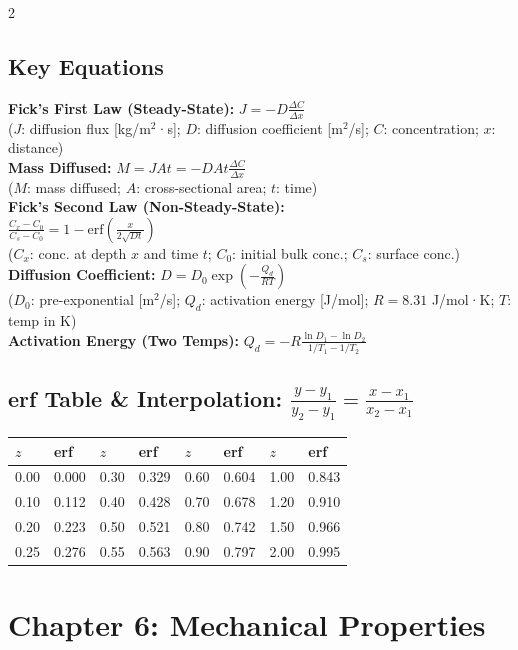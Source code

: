 \documentclass[8pt]{extarticle}
\begin{document}
\begin{multicols*}{2}
\subsection*{Key Equations}
\textbf{Fick's First Law (Steady-State):} $J = -D\frac{\Delta C}{\Delta x}$ \\
($J$: diffusion flux [kg/m$^2$·s]; $D$: diffusion coefficient [m$^2$/s]; $C$: concentration; $x$: distance) \\
\textbf{Mass Diffused:} $M = JAt = -DAt\frac{\Delta C}{\Delta x}$ \\
($M$: mass diffused; $A$: cross-sectional area; $t$: time) \\
\textbf{Fick's Second Law (Non-Steady-State):} \\
$\frac{C_x - C_0}{C_s - C_0} = 1 - \mathrm{erf}\!\left(\frac{x}{2\sqrt{Dt}}\right)$ \\
($C_x$: conc. at depth $x$ and time $t$; $C_0$: initial bulk conc.; $C_s$: surface conc.) \\
\textbf{Diffusion Coefficient:} $D = D_0\exp\!\left(-\frac{Q_d}{RT}\right)$ \\
($D_0$: pre-exponential [m$^2$/s]; $Q_d$: activation energy [J/mol]; $R=8.31$ J/mol·K; $T$: temp in K) \\
\textbf{Activation Energy (Two Temps):} $Q_d = -R\frac{\ln D_1 - \ln D_2}{1/T_1 - 1/T_2}$

\subsection*{erf Table \& Interpolation: $\frac{y-y_1}{y_2-y_1}=\frac{x-x_1}{x_2-x_1}$}
{\scriptsize
\begin{tabular}{@{}ll@{\ }ll@{\ }ll@{\ }ll@{}}
\toprule
$z$ & erf & $z$ & erf & $z$ & erf & $z$ & erf\\
\midrule
0.00&0.000 & 0.30&0.329 & 0.60&0.604 & 1.00&0.843\\
0.10&0.112 & 0.40&0.428 & 0.70&0.678 & 1.20&0.910\\
0.20&0.223 & 0.50&0.521 & 0.80&0.742 & 1.50&0.966\\
0.25&0.276 & 0.55&0.563 & 0.90&0.797 & 2.00&0.995\\
\bottomrule
\end{tabular}}

\section*{Chapter 6: Mechanical Properties}

\end{multicols*}
\end{document}
